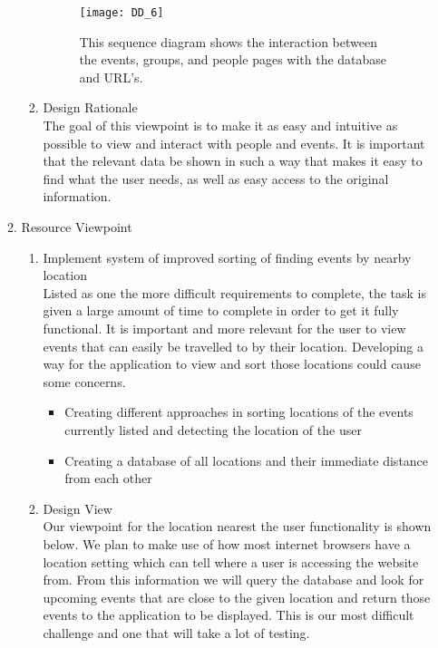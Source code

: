 \documentclass[draftclsnofoot,10pt,onecolumn]{IEEEtran} %
\begin{document}
\begin{enumerate}
\begin{enumerate}
\begin{enumerate}
				\begin{figure}[H]
  					\begin{center}
						\texttt{[image: DD\_6]}
						\captionsetup{width=.4\linewidth}
						\centering
  						\caption{This sequence diagram shows the interaction between the events, groups, and people pages with 
  						the database and URL's.}
  					\end{center}
				\end{figure}
				
				\item Design Rationale \\
				The goal of this viewpoint is to make it as easy and intuitive as possible to view and interact with people
				and events. It is important that the relevant data be shown in such a way that makes it easy to find what the
				user needs, as well as easy access to the original information. \\
			\end{enumerate}
			
		\item Resource Viewpoint \\
			\begin{enumerate}
				\item Implement system of improved sorting of finding events by nearby location \\
				Listed as one the more difficult requirements to complete, the task is given a large amount of time to
				complete in order to get it fully functional. It is important and more relevant for the user to view events that
				can easily be travelled to by their location. Developing a way for the application to view and sort those
				locations could cause some concerns.
				\begin{itemize}
					\item Creating different approaches in sorting locations of the events currently listed and detecting the
					location of the user
					\item Creating a database of all locations and their immediate distance from each other \\
				\end{itemize}
				
				\item Design View \\ %
				Our viewpoint for the location nearest the user functionality is shown below. We plan to make use of how
				most internet browsers have a location setting which can tell where a user is accessing the website from.
				From this information we will query the database and look for upcoming events that are close to the given
				location and return those events to the application to be displayed. This is our most difficult challenge and
				one that will take a lot of testing. \\
				

\end{enumerate}
\end{enumerate}
\end{enumerate}
\end{document}

